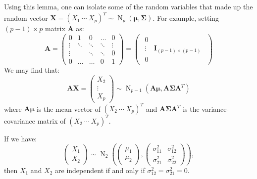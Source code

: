 \documentclass{huhtakm-template-book-v2}
\DeclareMathOperator{\N}{N}
\begin{document}
\begin{eg}
	Using this lemma, one can isolate some of the random variables that made up the random vector $\mathbf{X}=(X_{1}\ \cdots\ X_{p})^{T}\sim\N_{p}(\boldsymbol{\mu},\mathbf{\Sigma})$. For example, setting $(p-1)\times p$ matrix $\mathbf{A}$ as:
	\begin{equation*}
		\mathbf{A}=\begin{pmatrix}
			0 & 1 & 0 & \hdots & 0\\
			\vdots & \ddots & \ddots & \ddots & \vdots\\
			\vdots & & \ddots & \ddots & 0\\
			0 & \hdots & \hdots & 0 & 1
		\end{pmatrix}=\begin{pmatrix}\begin{array}{c|c}
			0 & \\
			\vdots & \mathbf{I}_{(p-1)\times(p-1)}\\
			0 &
		\end{array}\end{pmatrix}
	\end{equation*}
	We may find that:
	\begin{equation*}
		\mathbf{AX}=\begin{pmatrix}
		X_{2}\\
		\vdots\\
		X_{p}
		\end{pmatrix}\sim\N_{p-1}(\mathbf{A}\boldsymbol{\mu},\mathbf{A\Sigma A}^{T})
	\end{equation*}
	where $\mathbf{A}\boldsymbol{\mu}$ is the mean vector of $(X_{2}\ \cdots\ X_{p})^{T}$ and $\mathbf{A\Sigma A}^{T}$ is the variance-covariance matrix of $(X_{2}\ \cdots\ X_{p})^{T}$.
\end{eg}
\begin{lem}
	\label{Chapter 1 (Lemma) Independence iff uncorrelated and bivariate}
	If we have:
	\begin{equation*}
		\begin{pmatrix}X_{1}\\X_{2}\end{pmatrix}\sim\N_{2}\left(\begin{pmatrix}\mu_{1}\\\mu_{2}\end{pmatrix},\begin{pmatrix}\sigma_{11}^{2}&\sigma_{12}^{2}\\\sigma_{21}^{2}&\sigma_{22}^{2}\end{pmatrix}\right),
	\end{equation*}
	then $X_{1}$ and $X_{2}$ are independent if and only if $\sigma_{12}^{2}=\sigma_{21}^{2}=0$.
\end{lem}
\end{document}
